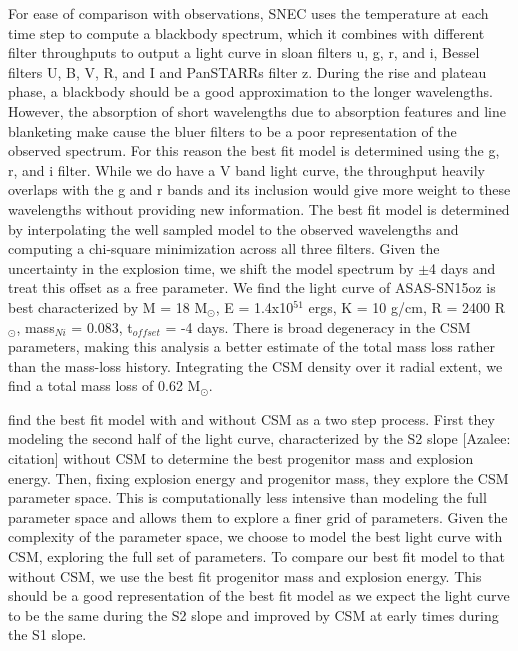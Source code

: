 \documentclass[preprint]{aastex61}   	%
\newcommand{\azaleecomment}[1]{{\color{red} [{#1}]}}
\newcommand{\Azalee}[1]{\azaleecomment{Azalee: #1}}
\newcommand{\msunperiod}{M$_{\odot}$}
\newcommand{\rsun}{R$_{\odot}$}
\begin{document}
For ease of comparison with observations, SNEC uses the temperature at each time step to compute a blackbody spectrum, which it combines with different filter throughputs to output a light curve in sloan filters u, g, r, and i, Bessel filters U, B, V, R, and I and PanSTARRs filter z. 
During the rise and plateau phase, a blackbody should be a good approximation to the longer wavelengths. 
However, the absorption of short wavelengths due to absorption features and line blanketing make cause the bluer filters to be a poor representation of the observed spectrum.
For this reason the best fit model is determined using the g, r, and i filter. 
While we do have a V band light curve, the throughput heavily overlaps with the g and r bands and its inclusion would give more weight to these wavelengths without providing new information.
The best fit model is determined by interpolating the well sampled model to the observed wavelengths and computing a chi-square minimization across all three filters.
Given the uncertainty in the explosion time, we shift the model spectrum by $\pm$4 days and treat this offset as a free parameter.
We find the light curve of ASAS-SN15oz is best characterized by M = 18 \msunperiod, E = 1.4x10$^{51}$ ergs, K = 10 g/cm, R = 2400 \rsun, mass$_{Ni}$ = 0.083, t$_{offset}$ = -4 days. 
There is broad degeneracy in the CSM parameters, making this analysis a better estimate of the total mass loss rather than the mass-loss history. 
Integrating the CSM density over it radial extent, we find a total mass loss of 0.62 \msunperiod. 

\citet{2018morozova} find the best fit model with and without CSM as a two step process. 
First they modeling the second half of the light curve, characterized by the S2 slope \Azalee{citation} without CSM to determine the best progenitor mass and explosion energy. 
Then, fixing explosion energy and progenitor mass, they explore the CSM parameter space. 
This is computationally less intensive than modeling the full parameter space and allows them to explore a finer grid of parameters.
Given the complexity of the parameter space, we choose to model the best light curve with CSM, exploring the full set of parameters. 
To compare our best fit model to that without CSM, we use the best fit progenitor mass and explosion energy. 
This should be a good representation of the best fit model as we expect the light curve to be the same during the S2 slope and improved by CSM at early times during the S1 slope.


\facility{}



\end{document}
